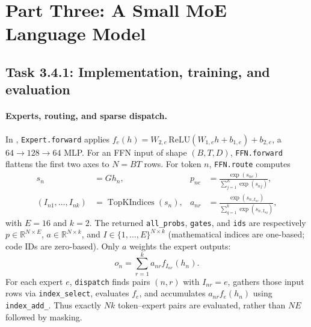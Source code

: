 \clearpage
\section{Part Three: A Small MoE Language Model}
\subsection{Task 3.4.1: Implementation, training, and evaluation}
\paragraph{Experts, routing, and sparse dispatch.}
In , \texttt{Expert.forward} applies
$f_e(h)=W_{2,e}\,\mathrm{ReLU}(W_{1,e}h+b_{1,e})+b_{2,e}$,
a $64\rightarrow128\rightarrow64$ MLP. For an FFN input of shape
$(B,T,D)$, \texttt{FFN.forward} flattens the first two axes to $N=BT$
rows. For token $n$, \texttt{FFN.route} computes
\begin{align}
s_n&=Gh_n, & p_{ne}&=\frac{\exp(s_{ne})}{\sum_{j=1}^{E}\exp(s_{nj})},\\
(I_{n1},\ldots,I_{nk})&=\operatorname{TopKIndices}(s_n), &
a_{nr}&=\frac{\exp(s_{n,I_{nr}})}{\sum_{q=1}^{k}\exp(s_{n,I_{nq}})},
\end{align}
with $E=16$ and $k=2$. The returned \texttt{all\_probs}, \texttt{gates},
and \texttt{ids} are respectively $p\in\mathbb R^{N\times E}$,
$a\in\mathbb R^{N\times k}$, and $I\in\{1,\ldots,E\}^{N\times k}$
(mathematical indices are one-based; code IDs are zero-based).
Only $a$ weights the expert outputs:
\begin{equation}
o_n=\sum_{r=1}^{k}a_{nr}f_{I_{nr}}(h_n).
\end{equation}
For each expert $e$, \texttt{dispatch} finds pairs $(n,r)$ with $I_{nr}=e$,
gathers those input rows via \texttt{index\_select}, evaluates $f_e$, and
accumulates $a_{nr}f_e(h_n)$ using \texttt{index\_add\_}. Thus exactly $Nk$
token--expert pairs are evaluated, rather than $NE$ followed by masking.

